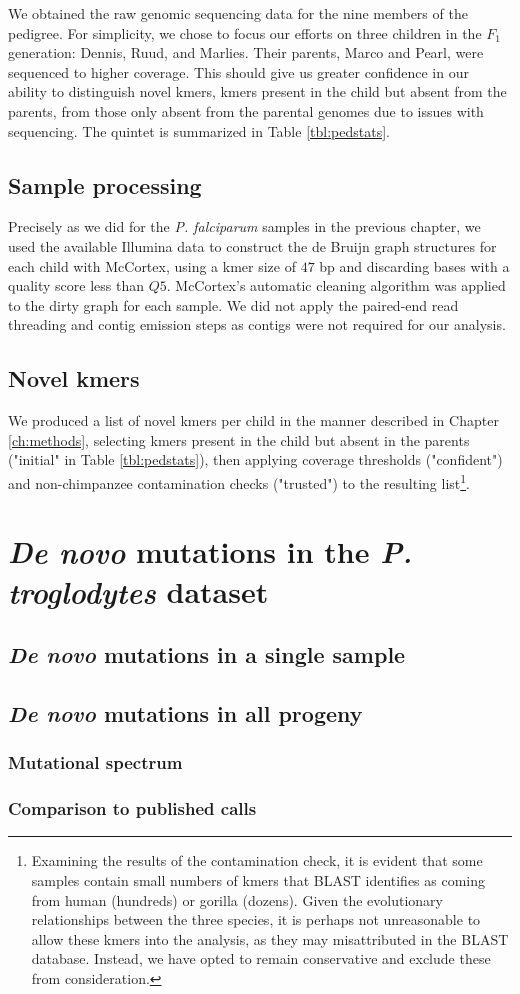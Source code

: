 We obtained the raw genomic sequencing data for the nine members of the pedigree.  For simplicity, we chose to focus our efforts on three children in the $F_1$ generation: Dennis, Ruud, and Marlies.  Their parents, Marco and Pearl, were sequenced to higher coverage.  This should give us greater confidence in our ability to distinguish novel kmers, kmers present in the child but absent from the parents, from those only absent from the parental genomes due to issues with sequencing.  The quintet is summarized in Table \ref{tbl:pedstats}.

\subsection{Sample processing}

Precisely as we did for the \textit{P. falciparum} samples in the previous chapter, we used the available Illumina data to construct the de Bruijn graph structures for each child with McCortex, using a kmer size of $47$ bp and discarding bases with a quality score less than $Q5$.  McCortex's automatic cleaning algorithm was applied to the dirty graph for each sample.  We did not apply the paired-end read threading and contig emission steps as contigs were not required for our analysis.

\subsection{Novel kmers}

We produced a list of novel kmers per child in the manner described in Chapter \ref{ch:methods}, selecting kmers present in the child but absent in the parents ("initial" in Table \ref{tbl:pedstats}), then applying coverage thresholds ("confident") and non-chimpanzee contamination checks ("trusted") to the resulting list\footnote{Examining the results of the contamination check, it is evident that some samples contain small numbers of kmers that BLAST identifies as coming from human (hundreds) or gorilla (dozens).  Given the evolutionary relationships between the three species, it is perhaps not unreasonable to allow these kmers into the analysis, as they may misattributed in the BLAST database.  Instead, we have opted to remain conservative and exclude these from consideration.}.

\section{\textit{De novo} mutations in the \textit{P. troglodytes} dataset}

\subsection{\textit{De novo} mutations in a single sample}
\subsection{\textit{De novo} mutations in all progeny}
\subsubsection{Mutational spectrum}
\subsubsection{Comparison to published calls}
